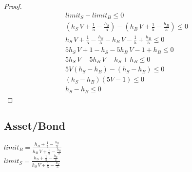 \documentclass[Bachelorarbeit.tex]{subfiles}
\begin{document}
\begin{proof}
\begin{align*}
	limit_S - limit_B \leq 0
	\\ (h_S \, V  + \frac{1}{5} - \frac{h_S}{5}) - ( h_B \, V  + \frac{1}{5} - \frac{h_B}{5} ) \leq 0
	\\ h_S \, V  + \frac{1}{5} - \frac{h_S}{5} -  h_B \, V  - \frac{1}{5} + \frac{h_B}{5} \leq 0
	\\ 5 h_S \, V  + 1 - h_S - 5h_B \, V  - 1 + h_B \leq 0
	\\ 5 h_S \, V - 5h_B \, V - h_S + h_B \leq 0
	\\ 5V(h_S - h_B) - (h_S - h_B) \leq 0	
	\\ (h_S - h_B)(5V - 1) \leq 0			\tag*{$|: (5V-1) \Rightarrow \geq 0 \; | \; V \; [0..1]$}
	\\ h_S - h_B \leq 0
\end{align*}
\end{proof}

\pagebreak

\subsection{Asset/Bond}
$limit_B = \frac{h_B + \frac{1}{5} - \frac{h_B}{5}}{h_B \, V + \frac{1}{5} - \frac{h_B}{5}}$ \\
$limit_S = \frac{h_S + \frac{1}{5} - \frac{h_S}{5}}{h_S \, V + \frac{1}{5} - \frac{h_S}{5}}$ \\
\end{document}
